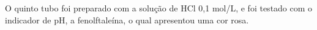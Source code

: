         \newpage

        \indent O quinto tubo foi preparado com a solução de HCl 0,1 mol/L, e foi testado com o indicador de pH, a fenolftaleína, o qual apresentou uma cor rosa.

        \begin{figure}[h]
            \centering
                \qquad

\end{figure}
